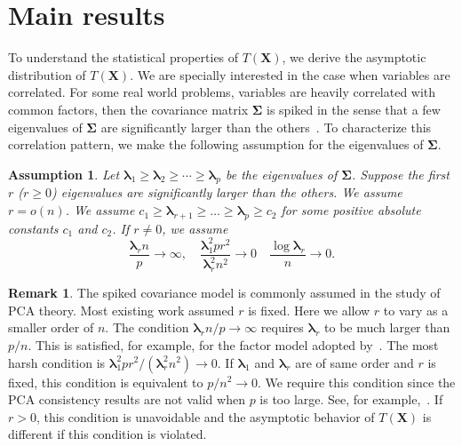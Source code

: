 \documentclass[12pt]{article} %
\newcommand{\bX}{\mathbf{X}}
\newcommand{\bfsym}[1]{\ensuremath{\boldsymbol{#1}}}
\def\blambda {\bfsym {\lambda}}
\def\bSigma {\bfsym {\Sigma}}
\newtheorem{assumption}{Assumption}
\theoremstyle{definition}
\newtheorem{remark}{Remark}
\begin{document}
\section{Main results}
To understand the statistical properties of $T(\bX)$, we derive the asymptotic distribution of $T(\bX)$.
We are specially interested in the case when variables are correlated.
For some real world problems, variables are heavily correlated with common factors, then the covariance matrix $\bSigma$ is spiked in the sense that a few eigenvalues of $\bSigma$ are significantly larger than the others~\citep{Fan2008High,Cai2012Sparse,Shen2013Consistency,Ma2015A}.
To characterize this correlation pattern, we make the following assumption for the eigenvalues of $\bSigma$.




\begin{assumption}\label{assumpEigen}
    Let $\blambda_1\geq \blambda_2\geq \cdots \geq \blambda_p$ be the eigenvalues of $\bSigma$.
    Suppose the first $r$ ($r\geq 0$) eigenvalues are significantly larger than the others.
    We assume $r=o(n)$.
    We assume
 $c_1 \geq \blambda_{r+1} \geq \ldots \geq \blambda_{p} \geq c_2$ for some positive absolute constants $c_1$ and $c_2$.
    If $r\neq 0$, we assume 
    $$\frac{\blambda_r n}{p}\to \infty,\quad
    \frac{\blambda_1^2 pr^2}{\blambda_r^2 n^2}\to 0\quad
        \frac{\log \blambda_r}{n}\to 0.$$
\end{assumption}

\begin{remark}
The spiked covariance model is commonly assumed in the study of PCA theory.
Most existing work assumed $r$ is fixed.
    Here we allow $r$ to vary as a smaller order of $n$.
    The condition $\blambda_r n/p\to \infty$ requires $\blambda_r$ to be much larger than $p/n$. This is satisfied, for example, for the factor model adopted by~\citet{Ma2015A}.
    The most harsh condition is $\blambda_1^2 p r^2 /(\blambda_r^2 n^2)\to 0$.
    If $\blambda_1$ and $\blambda_r$ are of same order and $r$ is fixed, this condition is equivalent to $p/n^2\to 0$.
    We require this condition since the PCA consistency results are not valid when $p$ is too large. See, for example,~\citep{Cai2012Sparse}.
    If $r>0$, this condition is unavoidable and the asymptotic behavior of $T(\bX)$ is different if this condition is violated.
\end{remark}
\end{document}
